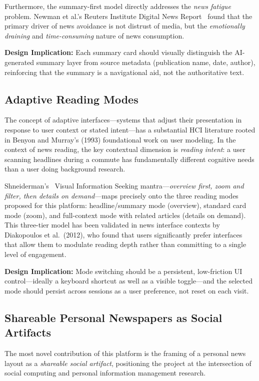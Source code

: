 \documentclass[14pt]{article}
\begin{document}
Furthermore, the summary-first model directly addresses the \emph{news fatigue} problem. Newman et al.'s Reuters Institute Digital News Report~\cite{newman2022} found that the primary driver of news avoidance is not distrust of media, but the \emph{emotionally draining} and \emph{time-consuming} nature of news consumption.

\smallskip
\noindent\textbf{Design Implication:} Each summary card should visually distinguish the AI-generated summary layer from source metadata (publication name, date, author), reinforcing that the summary is a navigational aid, not the authoritative text.

\subsection{Adaptive Reading Modes}

The concept of adaptive interfaces---systems that adjust their presentation in response to user context or stated intent---has a substantial HCI literature rooted in Benyon and Murray's (1993) foundational work on user modeling. In the context of news reading, the key contextual dimension is \emph{reading intent}: a user scanning headlines during a commute has fundamentally different cognitive needs than a user doing background research.

Shneiderman's~\cite{shneiderman1996} Visual Information Seeking mantra---\emph{overview first, zoom and filter, then details on demand}---maps precisely onto the three reading modes proposed for this platform: headline/summary mode (overview), standard card mode (zoom), and full-context mode with related articles (details on demand). This three-tier model has been validated in news interface contexts by Diakopoulos et al.\ (2012), who found that users significantly prefer interfaces that allow them to modulate reading depth rather than committing to a single level of engagement.

\smallskip
\noindent\textbf{Design Implication:} Mode switching should be a persistent, low-friction UI control---ideally a keyboard shortcut as well as a visible toggle---and the selected mode should persist across sessions as a user preference, not reset on each visit.

\subsection{Shareable Personal Newspapers as Social Artifacts}

The most novel contribution of this platform is the framing of a personal news layout as a \emph{shareable social artifact}, positioning the project at the intersection of social computing and personal information management research.
\end{document}
